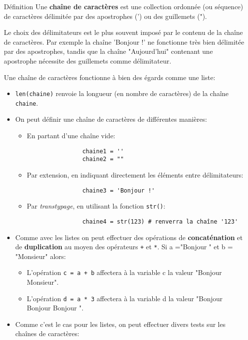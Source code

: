 \documentclass[12pt]{article}
\begin{document}
	\begin{MonAmp}{Définition}
		Une \textbf{chaîne de caractères} est une collection ordonnée (ou séquence) de caractères délimitée par des apostrophes (') ou des guillemets (").
	\end{MonAmp}
	
	Le choix des délimitateurs est le plus souvent imposé par le contenu de la chaîne de caractères. Par exemple la chaîne 'Bonjour !' ne fonctionne très bien délimitée par des apostrophes, tandis que la chaîne "Aujourd'hui" contenant une apostrophe nécessite des guillemets comme délimitateur.
	
	Une chaîne de caractères fonctionne à bien des égards comme une liste:
	\begin{itemize}
		\item \texttt{len(chaine)} renvoie la longueur (en nombre de caractères) de la chaîne \texttt{chaine}.
		\item On peut définir une chaîne de caractères de différentes manières:
		\begin{itemize}
			\item En partant d'une chaîne vide:
			\begin{verbatim}
				chaine1 = ''
				chaine2 = ""
			\end{verbatim}
			\item Par extension, en indiquant directement les éléments entre délimitateurs:
			\begin{verbatim}
				chaine3 = 'Bonjour !'
			\end{verbatim}
			\item Par \textit{transtypage}, en utilisant la fonction \texttt{str()}:
			\begin{verbatim}
				chaine4 = str(123) # renverra la chaîne '123'
			\end{verbatim}
		\end{itemize}
		\item Comme avec les listes on peut effectuer des opérations de \textbf{concaténation} et de \textbf{duplication} au moyen des opérateurs \texttt{+} et \texttt{*}. Si a ="Bonjour " et b = "Monsieur" alors:
		\begin{itemize}
			\item L'opération \texttt{c = a + b} affectera à la variable c la valeur "Bonjour Monsieur".
			\item L'opération \texttt{d = a * 3} affectera à la variable d la valeur "Bonjour Bonjour Bonjour ".
		\end{itemize}
		\item Comme c'est le cas pour les listes, on peut effectuer divers tests sur les chaînes de caractères:

\end{itemize}
\end{document}
